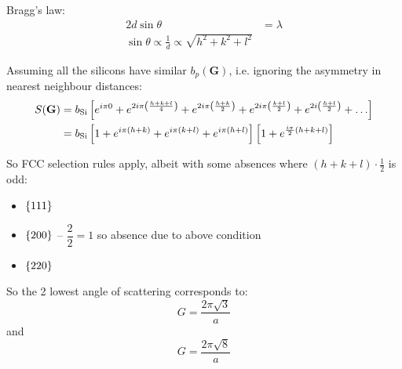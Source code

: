 \begin{parts}
	Bragg's law:
	\begin{align*}
		2d \sin\theta &= \lambda \\
		\sin\theta \propto \frac{1}{d} \propto \sqrt{h^2 + k^2 + l^2}
	\end{align*}
	
	Assuming all the silicons have similar $b_p (\mathbf{G})$, i.e. ignoring the asymmetry in nearest neighbour distances:
	\begin{align*}
		S(\mathbf{G}) &= b_\textnormal{Si} \left[e^{i\pi 0} + e^{2i\pi\left(\frac{h+k+l}{4}\right)} + e^{2i\pi\left(\frac{h+k}{2}\right)} + e^{2i\pi\left(\frac{k+l}{2}\right)} + e^{2i\left(\frac{h+l}{2}\right)} + \ldots\right] \\
		&= b_\textnormal{Si} \left[1 + e^{i\pi\left(h+k\right)} + e^{i\pi\left(k+l\right)} + e^{i\pi\left(h+l\right)}\right] \left[1 + e^{\frac{i\pi}{2}\left(h+k+l\right)}\right]
	\end{align*}
	
	So FCC selection rules apply, albeit with some absences where $(h+k+l)\cdot\frac{1}{2}$ is odd:
	\begin{itemize}
		\item $\left\{111\right\}$ 
		\item $\left\{200\right\}$  -- $\dfrac{2}{2}=1$ so absence due to above condition
		\item $\left\{220\right\}$ 
	\end{itemize}
	So the 2 lowest angle of scattering corresponds to:
	\begin{equation*}
		G = \frac{2\pi\sqrt{3}}{a}
	\end{equation*}
	and
	\begin{equation*}
		G = \frac{2\pi\sqrt{8}}{a}
	\end{equation*}
\end{parts}